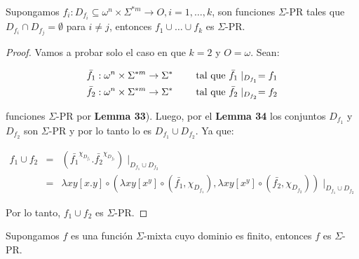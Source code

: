 
  \begin{lemma}
    \par Supongamos $f_{i}: D_{f_{i}} \subseteq \omega^{n} \times \Sigma^{\ast m} \rightarrow O, i = 1, \dotsc, k$, son
    funciones $\Sigma$-PR tales que $D_{f_{i}} \cap D_{f_{j}} = \emptyset$ para $i \neq j$, entonces $f_{1} \cup \dotsc
    \cup f_{k}$ es $\Sigma$-PR.
  \end{lemma}
  \begin{proof}
    \par Vamos a probar solo el caso en que $k = 2$ y $O = \omega$. Sean:

    \begin{eqnarray}
      \nonumber \bar{f}_{1}: \omega^{n} \times \Sigma^{\ast m} \rightarrow \Sigma^{\ast} \qquad \text{ tal que } \bar{f}_{1}
        \mid_{D_{f_{1}}} = f_{1} \\
      \nonumber \bar{f}_{2}: \omega^{n} \times \Sigma^{\ast m} \rightarrow \Sigma^{\ast} \qquad \text{ tal que } \bar{f}_{2}
        \mid_{D_{f_{2}}} = f_{2}
    \end{eqnarray}

    \par funciones $\Sigma$-PR por \textbf{Lemma 33}). Luego, por el \textbf{Lemma 34} los conjuntos $D_{f_{1}}$ y
    $D_{f_{2}}$ son $\Sigma$-PR y por lo tanto lo es $ D_{f_{1}} \cup D_{f_{2}}$. Ya que:

    \begin{eqnarray}
      \nonumber f_{1} \cup f_{2} &=& \left(\bar{f_{1}}^{\chi_{D_{f_{1}}}} . \bar{f_{2}}^{\chi_{D_{f_{2}}}}\right)
        \mid_{D_{f_{1}} \cup D_{f_{2}}} \\
      \nonumber &=& \lambda xy \left[x.y\right] \circ \left(\lambda xy \left[x^{y}\right] \circ (\bar{f_{1}},
        \chi_{D_{f_{1}}}), \lambda xy \left[x^{y}\right] \circ (\bar{f_{2}}, \chi_{D_{f_{2}}}) \right) \mid_{D_{f_{1}}
        \cup D_{f_{2}}}
    \end{eqnarray}

    \par Por lo tanto, $f_{1} \cup f_{2}$ es $\Sigma$-PR.
  \end{proof}

  \begin{corollary}
    \par Supongamos $f$ es una función $\Sigma$-mixta cuyo dominio es finito, entonces $f$ es $\Sigma$-PR.
  \end{corollary}

